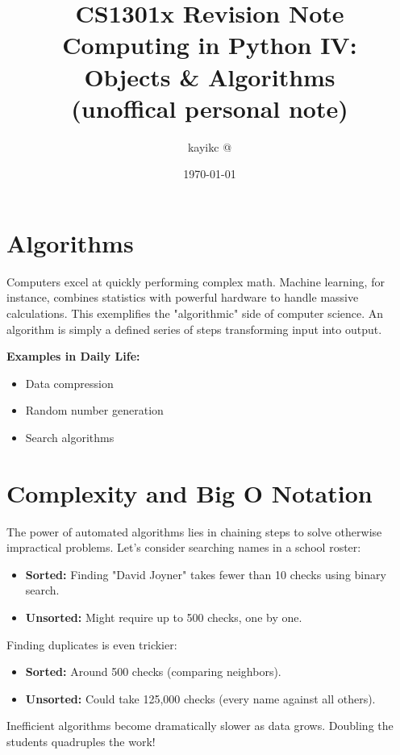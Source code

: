 \documentclass[12pt, a4paper]{article}
\title{CS1301x Revision Note\\
\Large Computing in Python IV:\\
\large Objects \& Algorithms\\
\normalsize (unoffical personal note)}
\date{\today}
\author{kayikc @}
\begin{document}
\maketitle
\tableofcontents
\pagebreak
\section{Algorithms}

Computers excel at quickly performing complex math.  Machine learning, for instance, combines statistics with powerful hardware to handle massive calculations.  This exemplifies the "algorithmic" side of computer science.  An algorithm is simply a defined series of steps transforming input into output.

\textbf{Examples in Daily Life:}
\begin{itemize}
    \item Data compression
    \item Random number generation
    \item Search algorithms
\end{itemize}



\section{Complexity and Big O Notation}

The power of automated algorithms lies in chaining steps to solve otherwise impractical problems.  Let's consider searching names in a school roster:

\begin{itemize}
    \item \textbf{Sorted:} Finding "David Joyner" takes fewer than 10 checks using binary search.
    \item \textbf{Unsorted:}  Might require up to 500 checks, one by one.
\end{itemize}

Finding duplicates is even trickier:

\begin{itemize}
    \item \textbf{Sorted:}  Around 500 checks (comparing neighbors).
    \item \textbf{Unsorted:}  Could take 125,000 checks (every name against all others).
\end{itemize}

Inefficient algorithms become dramatically slower as data grows. Doubling the students quadruples the work!
\end{document}
